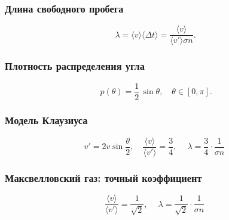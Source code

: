 \documentclass[12pt, a4paper]{article}
\begin{document}
\subsubsection*{Длина свободного пробега}
\[
\lambda = \langle v \rangle \langle \Delta t \rangle = \frac{\langle v \rangle}{\langle v' \rangle \sigma n}.
\]

\subsubsection*{Плотность распределения угла}
\[
\boxed{\,p(\theta)=\frac12\,\sin\theta,\quad \theta\in[0,\pi].}
\]

\subsubsection*{Модель Клаузиуса}
\[
v' = 2v\sin\frac{\theta}{2}, \quad
\frac{\langle v \rangle}{\langle v' \rangle}=\frac{3}{4}, \quad
\boxed{\ \lambda=\frac{3}{4}\cdot\frac{1}{\sigma n}\ }
\]

\subsubsection*{Максвелловский газ: точный коэффициент}
\[
\frac{\langle v \rangle}{\langle v' \rangle}=\frac{1}{\sqrt2}, \quad
\boxed{\ \lambda=\frac{1}{\sqrt2}\cdot\frac{1}{\sigma n}\ }
\]
\end{document}
